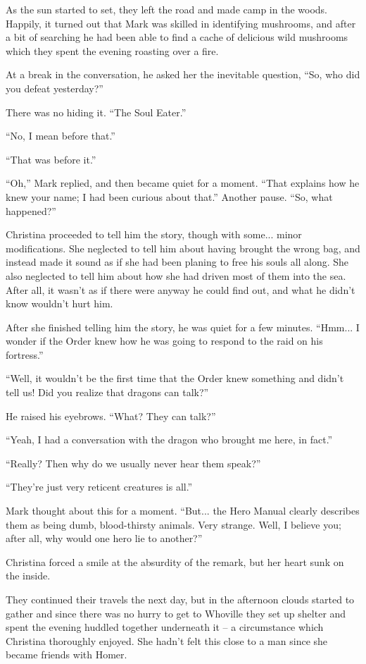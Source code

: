 \documentclass[showtrims,b6paper,draft,10pt]{memoir}
\begin{document}
As the sun started to set, they left the road and made camp in the woods.  Happily, it turned out that Mark was skilled in identifying mushrooms, and after a bit of searching he had been able to find a cache of delicious wild mushrooms which they spent the evening roasting over a fire.

At a break in the conversation, he asked her the inevitable question, ``So, who did you defeat yesterday?''

There was no hiding it.  ``The Soul Eater.''

``No, I mean before that.''

``That was before it.''

``Oh,'' Mark replied, and then became quiet for a moment.  ``That explains how he knew your name;  I had been curious about that.''  Another pause.  ``So, what happened?''

Christina proceeded to tell him the story, though with some... minor modifications.  She neglected to tell him about having brought the wrong bag, and instead made it sound as if she had been planing to free his souls all along.  She also neglected to tell him about how she had driven most of them into the sea.  After all, it wasn't as if there were anyway he could find out, and what he didn't know wouldn't hurt him.

After she finished telling him the story, he was quiet for a few minutes.  ``Hmm...  I wonder if the Order knew how he was going to respond to the raid on his fortress.''

``Well, it wouldn't be the first time that the Order knew something and didn't tell us!  Did you realize that dragons can talk?''

He raised his eyebrows.  ``What?  They can talk?''

``Yeah, I had a conversation with the dragon who brought me here, in fact.''

``Really?  Then why do we usually never hear them speak?''

``They're just very reticent creatures is all.''

Mark thought about this for a moment.  ``But... the Hero Manual clearly describes them as being dumb, blood-thirsty animals.  Very strange.  Well, I believe you;  after all, why would one hero lie to another?''

Christina forced a smile at the absurdity of the remark, but her heart sunk on the inside.

\timeskip

They continued their travels the next day, but in the afternoon clouds started to gather and since there was no hurry to get to Whoville they set up shelter and spent the evening huddled together underneath it -- a circumstance which Christina thoroughly enjoyed.  She hadn't felt this close to a man since she became friends with Homer.
\end{document}
